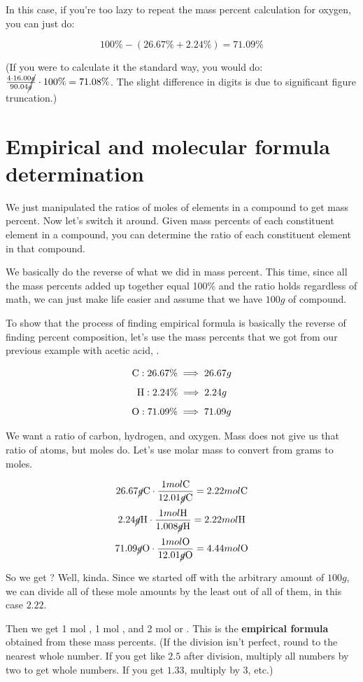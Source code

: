 \documentclass[letterpaper, 12pt]{article}
\begin{document}
In this case, if you're too lazy to repeat the mass percent calculation for oxygen, you can just do:

$$100\% - (26.67\% + 2.24\%) = 71.09\%$$

(If you were to calculate it the standard way, you would do: $\frac{4 \cdot 16.00 \cancel{g}}{90.04 \cancel{g}} \cdot 100\% = 71.08\%$. The slight difference in digits is due to significant figure truncation.)

\section{Empirical and molecular formula determination}
We just manipulated the ratios of moles of elements in a compound to get mass percent. Now let's switch it around. Given mass percents of each constituent element in a compound, you can determine the ratio of each constituent element in that compound.

We basically do the reverse of what we did in mass percent. This time, since all the mass percents added up together equal 100\% and the ratio holds regardless of math, we can just make life easier and assume that we have $100 g$ of compound.

To show that the process of finding empirical formula is basically the reverse of finding percent composition, let's use the mass percents that we got from our previous example with acetic acid, .

$$\ce{C}: 26.67\% \implies 26.67 g$$
$$\ce{H}: 2.24\% \implies 2.24 g$$
$$\ce{O}: 71.09\% \implies 71.09 g$$

We want a ratio of carbon, hydrogen, and oxygen. Mass does not give us that ratio of atoms, but moles do. Let's use molar mass to convert from grams to moles.

$$26.67 \cancel{g} \ce{C} \cdot \frac{1 mol \ce{C}}{12.01 \cancel{g} \ce{C}} = 2.22 mol \ce{C}$$
$$2.24 \cancel{g} \ce{H} \cdot \frac{1 mol \ce{H}}{1.008 \cancel{g} \ce{H}} = 2.22 mol \ce{H}$$
$$71.09 \cancel{g} \ce{O} \cdot \frac{1 mol \ce{O}}{12.01 \cancel{g} \ce{O}} = 4.44 mol \ce{O}$$

So we get ? Well, kinda. Since we started off with the arbitrary amount of $100 g$, we can divide all of these mole amounts by the least out of all of them, in this case $2.22$.

Then we get 1 mol , 1 mol , and 2 mol  or . This is the \textbf{empirical formula} obtained from these mass percents. (If the division isn't perfect, round to the nearest whole number. If you get like $2.5$ after division, multiply all numbers by two to get whole numbers. If you get $1.33$, multiply by 3, etc.)
\end{document}
